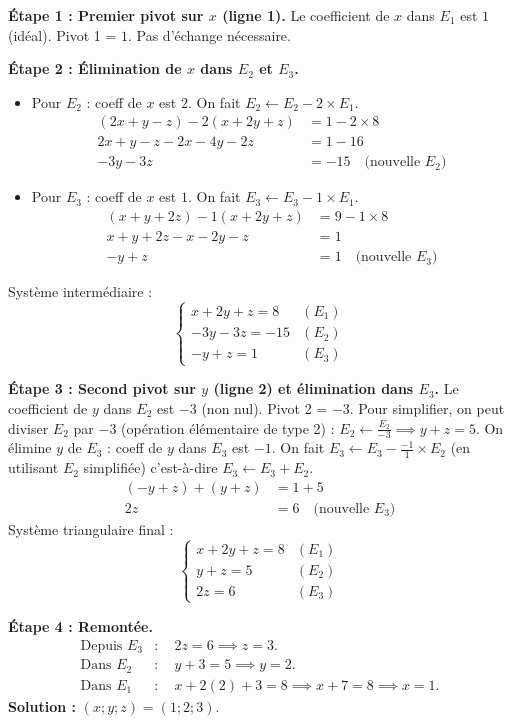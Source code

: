 \documentclass[11pt]{article}
\begin{document}
\begin{exemplebox}
\textbf{Étape 1 : Premier pivot sur $x$ (ligne 1).}
Le coefficient de $x$ dans $E_1$ est $1$ (idéal). Pivot 1 = $1$. Pas d'échange nécessaire.

\textbf{Étape 2 : Élimination de $x$ dans $E_2$ et $E_3$.}
\begin{itemize}
    \item Pour $E_2$ : coeff de $x$ est $2$. On fait $E_2 \leftarrow E_2 - 2 \times E_1$.
    \begin{align*}
        (2x + y - z) - 2(x + 2y + z) &= 1 - 2\times 8 \\
        2x + y - z - 2x - 4y - 2z &= 1 - 16 \\
        -3y - 3z &= -15 \quad \text{(nouvelle } E_2\text{)}
    \end{align*}
    \item Pour $E_3$ : coeff de $x$ est $1$. On fait $E_3 \leftarrow E_3 - 1 \times E_1$.
    \begin{align*}
        (x + y + 2z) - 1(x + 2y + z) &= 9 - 1\times 8 \\
        x + y + 2z - x - 2y - z &= 1 \\
        -y + z &= 1 \quad \text{(nouvelle } E_3\text{)}
    \end{align*}
\end{itemize}
Système intermédiaire :
\[
\begin{cases}
x + 2y + z = 8 & (E_1)\\
-3y - 3z = -15 & (E_2)\\
-y + z = 1 & (E_3)
\end{cases}
\]

\textbf{Étape 3 : Second pivot sur $y$ (ligne 2) et élimination dans $E_3$.}
Le coefficient de $y$ dans $E_2$ est $-3$ (non nul). Pivot 2 = $-3$.
Pour simplifier, on peut diviser $E_2$ par $-3$ (opération élémentaire de type 2) : $E_2 \leftarrow \frac{E_2}{-3} \implies y + z = 5$.
On élimine $y$ de $E_3$ : coeff de $y$ dans $E_3$ est $-1$. On fait $E_3 \leftarrow E_3 - \frac{-1}{1} \times E_2$ (en utilisant $E_2$ simplifiée) c'est-à-dire $E_3 \leftarrow E_3 + E_2$.
\begin{align*}
(-y + z) + (y + z) &= 1 + 5 \\
2z &= 6 \quad \text{(nouvelle } E_3\text{)}
\end{align*}
Système triangulaire final :
\[
\begin{cases}
x + 2y + z = 8 & (E_1)\\
y + z = 5 & (E_2)\\
2z = 6 & (E_3)
\end{cases}
\]

\textbf{Étape 4 : Remontée.}
\begin{align*}
\text{Depuis } E_3 &: \quad 2z = 6 \implies \boxed{z = 3}. \\
\text{Dans } E_2 &: \quad y + 3 = 5 \implies \boxed{y = 2}. \\
\text{Dans } E_1 &: \quad x + 2(2) + 3 = 8 \implies x + 7 = 8 \implies \boxed{x = 1}.
\end{align*}
\textbf{Solution :} $(x ; y ; z) = (1 ; 2 ; 3)$.
\end{exemplebox}
\end{document}

